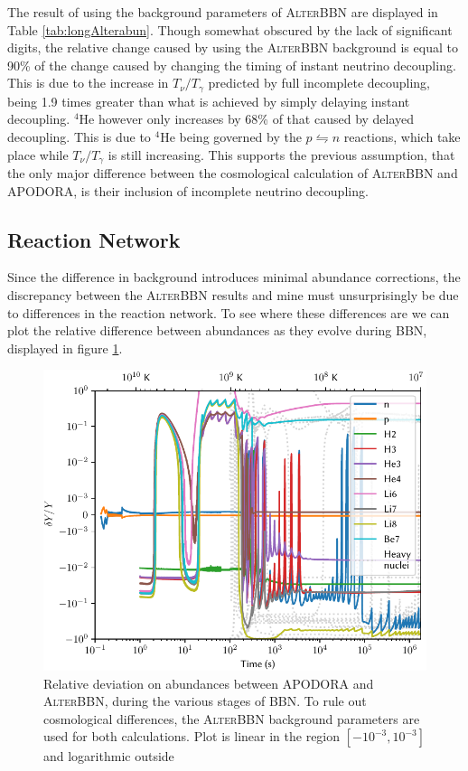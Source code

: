 The result of using the background parameters of \textsc{AlterBBN} are displayed in Table \ref{tab:longAlterabun}. Though somewhat obscured by the lack of significant digits, the relative change caused by using the \textsc{AlterBBN} background is equal to 90\% of the change caused by changing the timing of instant neutrino decoupling. This is due to the increase in $T_\nu/T_\gamma$ predicted by full incomplete decoupling, being 1.9 times greater than what is achieved by simply delaying instant decoupling. ${}^4$He however only increases by 68\% of that caused by delayed decoupling. This is due to ${}^4$He being governed by the $p\leftrightharpoons n$ reactions, which take place while $T_\nu/T_\gamma$ is still increasing. This supports the previous assumption, that the only major difference between the cosmological calculation of \textsc{AlterBBN} and APODORA, is their inclusion of incomplete neutrino decoupling.

\subsection{Reaction Network}

Since the difference in background introduces minimal abundance corrections, the discrepancy between the \textsc{AlterBBN} results and mine must unsurprisingly be due to differences in the reaction network. To see where these differences are we can plot the relative difference between abundances as they evolve during BBN, displayed in figure \ref{fig:AlterBBNdeltaY}. 
\begin{figure}[ht]
    \includegraphics[width=5.1in]{figures/AlterBBNdeltaY.pdf}
    \caption{Relative deviation on abundances between APODORA and \textsc{AlterBBN}, during the various stages of BBN. To rule out cosmological differences, the \textsc{AlterBBN} background parameters are used for both calculations. Plot is linear in the region $[-10^{-3},10^{-3}]$ and logarithmic outside}
    \label{fig:AlterBBNdeltaY}
\end{figure}


